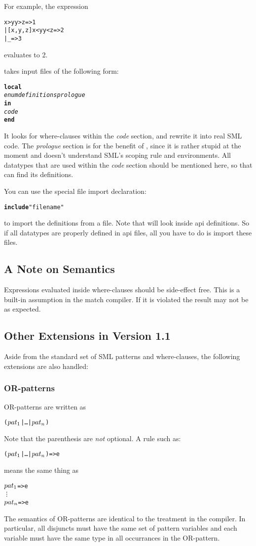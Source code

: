For example, the expression
\begin{alltt}
   \CASE [1,2,3] \OF 
      [x,y,z] \WHERE x>y \AND y>z => 1
    | [x,y,z] \WHERE x<y \AND y<z => 2
    | _ => 3
\end{alltt}
evaluates to 2.

\Nowhere{} takes input files of the following form:
\begin{alltt}
{\bf local}
    {\sl enum definitions prologue}
{\bf in}
    {\sl code}
{\bf end}
\end{alltt}
It looks for where-clauses within the {\sl code} section, and rewrite it into
real SML code.  The {\sl prologue} section is for the benefit
of \nowhere, since it is rather stupid at the moment and doesn't understand
SML's scoping rule and environments.  
All datatypes that are used within the {\sl code}
section should be mentioned here, so that \nowhere{} can find its definitions.

You can use the special file import declaration:
\begin{alltt}
  {\bf include} "filename"
\end{alltt}
to import the definitions from a file.  Note that \nowhere{} will look 
inside api definitions.  So if all datatypes are
properly defined in api files, all you have to do is import these
files.

\subsection{A Note on Semantics}
   Expressions evaluated inside where-clauses should be side-effect free.
This is a built-in assumption in the match compiler.  If it is violated
the result may not be as expected. 

\subsection{Other Extensions in Version 1.1}

  Aside from the standard set of SML patterns and where-clauses, 
the following extensions are also handled:
\subsubsection{OR-patterns}   OR-patterns are written as
\begin{alltt}
   (\(pat\sb{1}\) | \ldots | \(pat\sb{n}\))
\end{alltt}
Note that the parenthesis are {\em not} optional.  A rule such as:
\begin{alltt}
   (\(pat\sb{1}\) | \ldots | \(pat\sb{n}\)) => e
\end{alltt}
means the same thing as
\begin{alltt}
   \(pat\sb{1}\) => e
     \vdots
   \(pat\sb{n}\) => e
\end{alltt}
The semantics of OR-patterns are identical to the treatment in the compiler.
In particular, all disjuncts must have the same set of pattern variables
and each variable must have the same type in all occurrances in the OR-pattern. 

